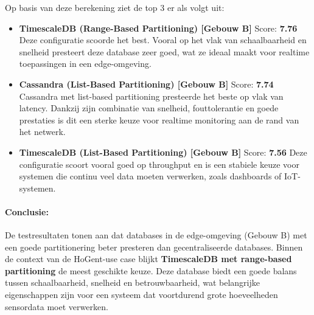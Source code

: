 Op basis van deze berekening ziet de top 3 er als volgt uit:

\begin{itemize}
    \item \textbf{TimescaleDB (Range-Based Partitioning) [Gebouw B]} Score: \textbf{7.76}  
    Deze configuratie scoorde het best. Vooral op het vlak van schaalbaarheid en snelheid presteert deze database zeer goed, wat ze ideaal maakt voor realtime toepassingen in een edge-omgeving.

    \item \textbf{Cassandra (List-Based Partitioning) [Gebouw B]} Score: \textbf{7.74}  
    Cassandra met list-based partitioning presteerde het beste op vlak van latency. Dankzij zijn combinatie van snelheid, fouttolerantie en goede prestaties is dit een sterke keuze voor realtime monitoring aan de rand van het netwerk.

    \item \textbf{TimescaleDB (List-Based Partitioning) [Gebouw B]} Score: \textbf{7.56}  
    Deze configuratie scoort vooral goed op throughput en is een stabiele keuze voor systemen die continu veel data moeten verwerken, zoals dashboards of IoT-systemen.
\end{itemize}

\paragraph{Conclusie:}
De testresultaten tonen aan dat databases in de edge-omgeving (Gebouw B) met een goede partitionering beter presteren dan gecentraliseerde databases.  
Binnen de context van de HoGent-use case blijkt \textbf{TimescaleDB met range-based partitioning} de meest geschikte keuze. Deze database biedt een goede balans tussen schaalbaarheid, snelheid en betrouwbaarheid, wat belangrijke eigenschappen zijn voor een systeem dat voortdurend grote hoeveelheden sensordata moet verwerken.